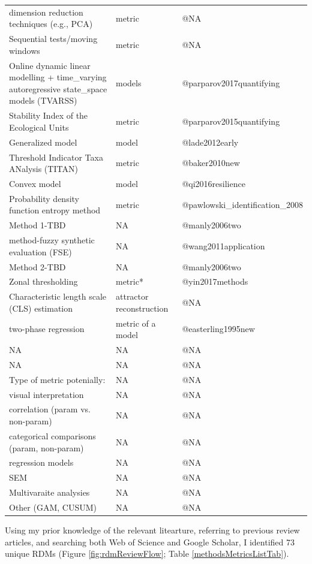 \documentclass[12pt,twoside,openany]{reedthesis}
\begin{document}
\begin{longtable}{lll}
dimension reduction techniques (e.g., PCA) & metric & @NA\\
\addlinespace
Sequential tests/moving windows & metric & @NA\\
Online dynamic linear modelling +  time\_varying autoregressive state\_space models (TVARSS) & models & @parparov2017quantifying\\
Stability Index of the Ecological Units & metric & @parparov2015quantifying\\
Generalized model & model & @lade2012early\\
Threshold Indicator Taxa ANalysis (TITAN) & metric & @baker2010new\\
\addlinespace
Convex model & model & @qi2016resilience\\
Probability density function entropy method & metric & @pawlowski\_identification\_2008\\
Method 1-TBD & NA & @manly2006two\\
method-fuzzy synthetic evaluation (FSE) & NA & @wang2011application\\
Method 2-TBD & NA & @manly2006two\\
\addlinespace
Zonal thresholding & metric* & @yin2017methods\\
Characteristic length scale (CLS) estimation & attractor reconstruction & @NA\\
two-phase regression & metric of a model & @easterling1995new\\
NA & NA & @NA\\
NA & NA & @NA\\
\addlinespace
Type of metric potenially: & NA & @NA\\
visual interpretation & NA & @NA\\
correlation (param vs. non-param) & NA & @NA\\
categorical comparisons (param, non-param) & NA & @NA\\
regression models & NA & @NA\\
\addlinespace
SEM & NA & @NA\\
Multivaraite analysies & NA & @NA\\
Other (GAM, CUSUM) & NA & @NA\\*
\end{longtable}
Using my prior knowledge of the relevant litearture, referring to
previous review articles, and searching both Web of Science and Google
Scholar, I identified 73 unique RDMs (Figure \ref{fig:rdmReviewFlow};
Table \ref{methodsMetricsListTab}).
\end{document}
